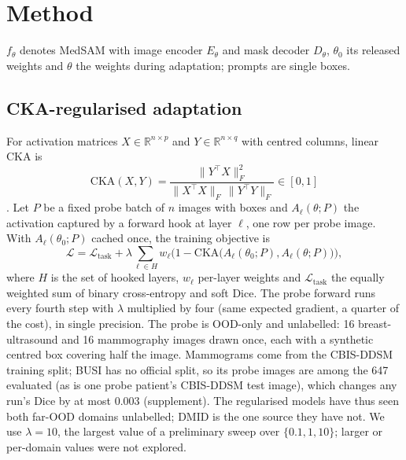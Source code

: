 \section{Method}
\label{sec:method}

$f_\theta$ denotes MedSAM with image encoder $E_\theta$ and mask decoder $D_\theta$, $\theta_0$ its released weights and $\theta$ the weights during adaptation; prompts are single boxes.

\subsection{CKA-regularised adaptation}
\label{sec:cka_loss}

For activation matrices $X \in \mathbb{R}^{n \times p}$ and $Y \in \mathbb{R}^{n \times q}$ with centred columns, linear CKA is
\begin{equation}
  \mathrm{CKA}(X, Y) = \frac{\lVert Y^\top X \rVert_F^2}{\lVert X^\top X \rVert_F \,\lVert Y^\top Y \rVert_F} \in [0,1]
\end{equation}
\cite{kornblith2019cka}. Let $P$ be a fixed probe batch of $n$ images with boxes and $A_\ell(\theta; P)$ the activation captured by a forward hook at layer $\ell$, one row per probe image. With $A_\ell(\theta_0; P)$ cached once, the training objective is
\begin{equation}
  \mathcal{L} = \mathcal{L}_{\text{task}} + \lambda \sum_{\ell \in H} w_\ell \bigl(1 - \mathrm{CKA}\bigl(A_\ell(\theta_0; P), A_\ell(\theta; P)\bigr)\bigr),
  \label{eq:loss}
\end{equation}
where $H$ is the set of hooked layers, $w_\ell$ per-layer weights and $\mathcal{L}_{\text{task}}$ the equally weighted sum of binary cross-entropy and soft Dice. The probe forward runs every fourth step with $\lambda$ multiplied by four (same expected gradient, a quarter of the cost), in single precision. The probe is OOD-only and unlabelled: 16 breast-ultrasound and 16 mammography images drawn once, each with a synthetic centred box covering half the image. Mammograms come from the CBIS-DDSM training split; BUSI has no official split, so its probe images are among the 647 evaluated (as is one probe patient's CBIS-DDSM test image), which changes any run's Dice by at most 0.003 (supplement). The regularised models have thus seen both far-OOD domains unlabelled; DMID is the one source they have not. We use $\lambda = 10$, the largest value of a preliminary sweep over $\{0.1, 1, 10\}$; larger or per-domain values were not explored.

